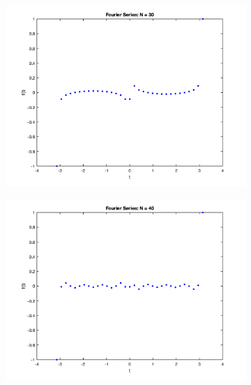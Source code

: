 \documentclass[12pt]{article}
\begin{document}
\begin{figure}[h!]
\begin{subfigure}{0.49\columnwidth}
\centering
\includegraphics[width=\textwidth]{fs_n_30.png}
\caption{}
\label{fig:time3}
\end{subfigure}\hfill
\begin{subfigure}{0.49\columnwidth}
\centering
\includegraphics[width=\textwidth]{fs_n_40.png}
\caption{}
\label{fig:time4}
\end{subfigure}

\medskip


\end{figure}
\end{document}
